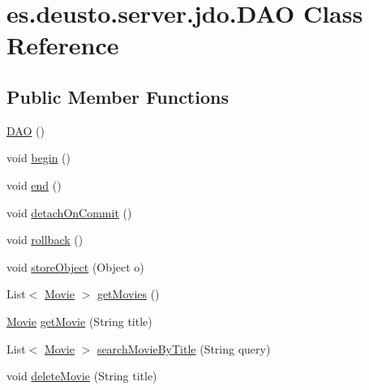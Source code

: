 \hypertarget{classes_1_1deusto_1_1server_1_1jdo_1_1_d_a_o}{}\section{es.\+deusto.\+server.\+jdo.\+D\+AO Class Reference}
\label{classes_1_1deusto_1_1server_1_1jdo_1_1_d_a_o}
\subsection*{Public Member Functions}
\begin{DoxyCompactItemize}
\item 
\mbox{\hyperlink{classes_1_1deusto_1_1server_1_1jdo_1_1_d_a_o_a6b7d3b6555e4f370d347919a33620607}{D\+AO}} ()
\item 
void \mbox{\hyperlink{classes_1_1deusto_1_1server_1_1jdo_1_1_d_a_o_ad923bb21c8273dabc601b85713703c89}{begin}} ()
\item 
void \mbox{\hyperlink{classes_1_1deusto_1_1server_1_1jdo_1_1_d_a_o_a376574d8ad006d0bad98e39172b67847}{end}} ()
\item 
void \mbox{\hyperlink{classes_1_1deusto_1_1server_1_1jdo_1_1_d_a_o_afb5b546d4ade9c2cab1f769e0b0c82bf}{detach\+On\+Commit}} ()
\item 
void \mbox{\hyperlink{classes_1_1deusto_1_1server_1_1jdo_1_1_d_a_o_ac2a137746dce274ba0a89eb388820bcf}{rollback}} ()
\item 
void \mbox{\hyperlink{classes_1_1deusto_1_1server_1_1jdo_1_1_d_a_o_a663255898c034b46536c8a9cd2b247f9}{store\+Object}} (Object o)
\item 
List$<$ \mbox{\hyperlink{classes_1_1deusto_1_1server_1_1jdo_1_1_movie}{Movie}} $>$ \mbox{\hyperlink{classes_1_1deusto_1_1server_1_1jdo_1_1_d_a_o_a23dfafaa747b95ec24c9df6ca678e7d7}{get\+Movies}} ()
\item 
\mbox{\hyperlink{classes_1_1deusto_1_1server_1_1jdo_1_1_movie}{Movie}} \mbox{\hyperlink{classes_1_1deusto_1_1server_1_1jdo_1_1_d_a_o_a9bbbc5fb0fa218f2feefc3c813edc305}{get\+Movie}} (String title)
\item 
List$<$ \mbox{\hyperlink{classes_1_1deusto_1_1server_1_1jdo_1_1_movie}{Movie}} $>$ \mbox{\hyperlink{classes_1_1deusto_1_1server_1_1jdo_1_1_d_a_o_a58c4f711e3e60688619f8a065073f4ff}{search\+Movie\+By\+Title}} (String query)
\item 
void \mbox{\hyperlink{classes_1_1deusto_1_1server_1_1jdo_1_1_d_a_o_a9bcf552682ef562673a7c725d003debf}{delete\+Movie}} (String title)
\item 

\end{DoxyCompactItemize}
